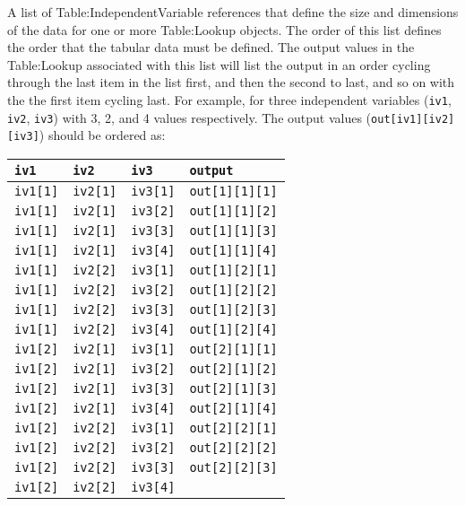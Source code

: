 A list of Table:IndependentVariable references that define the size and
dimensions of the data for one or more Table:Lookup objects. The order
of this list defines the order that the tabular data must be defined.
The output values in the Table:Lookup associated with this list will
list the output in an order cycling through the last item in the list
first, and then the second to last, and so on with the the first item
cycling last. For example, for three independent variables
(\texttt{iv1}, \texttt{iv2}, \texttt{iv3}) with 3, 2, and 4 values
respectively. The output values
(\texttt{out{[}iv1{]}{[}iv2{]}{[}iv3{]}}) should be ordered as:

\begin{longtable}[]{@{}llll@{}}
\toprule
\texttt{iv1} & \texttt{iv2} & \texttt{iv3} &
\texttt{output}\tabularnewline
\midrule
\endhead
\texttt{iv1{[}1{]}} & \texttt{iv2{[}1{]}} & \texttt{iv3{[}1{]}} &
\texttt{out{[}1{]}{[}1{]}{[}1{]}}\tabularnewline
\texttt{iv1{[}1{]}} & \texttt{iv2{[}1{]}} & \texttt{iv3{[}2{]}} &
\texttt{out{[}1{]}{[}1{]}{[}2{]}}\tabularnewline
\texttt{iv1{[}1{]}} & \texttt{iv2{[}1{]}} & \texttt{iv3{[}3{]}} &
\texttt{out{[}1{]}{[}1{]}{[}3{]}}\tabularnewline
\texttt{iv1{[}1{]}} & \texttt{iv2{[}1{]}} & \texttt{iv3{[}4{]}} &
\texttt{out{[}1{]}{[}1{]}{[}4{]}}\tabularnewline
\texttt{iv1{[}1{]}} & \texttt{iv2{[}2{]}} & \texttt{iv3{[}1{]}} &
\texttt{out{[}1{]}{[}2{]}{[}1{]}}\tabularnewline
\texttt{iv1{[}1{]}} & \texttt{iv2{[}2{]}} & \texttt{iv3{[}2{]}} &
\texttt{out{[}1{]}{[}2{]}{[}2{]}}\tabularnewline
\texttt{iv1{[}1{]}} & \texttt{iv2{[}2{]}} & \texttt{iv3{[}3{]}} &
\texttt{out{[}1{]}{[}2{]}{[}3{]}}\tabularnewline
\texttt{iv1{[}1{]}} & \texttt{iv2{[}2{]}} & \texttt{iv3{[}4{]}} &
\texttt{out{[}1{]}{[}2{]}{[}4{]}}\tabularnewline
\texttt{iv1{[}2{]}} & \texttt{iv2{[}1{]}} & \texttt{iv3{[}1{]}} &
\texttt{out{[}2{]}{[}1{]}{[}1{]}}\tabularnewline
\texttt{iv1{[}2{]}} & \texttt{iv2{[}1{]}} & \texttt{iv3{[}2{]}} &
\texttt{out{[}2{]}{[}1{]}{[}2{]}}\tabularnewline
\texttt{iv1{[}2{]}} & \texttt{iv2{[}1{]}} & \texttt{iv3{[}3{]}} &
\texttt{out{[}2{]}{[}1{]}{[}3{]}}\tabularnewline
\texttt{iv1{[}2{]}} & \texttt{iv2{[}1{]}} & \texttt{iv3{[}4{]}} &
\texttt{out{[}2{]}{[}1{]}{[}4{]}}\tabularnewline
\texttt{iv1{[}2{]}} & \texttt{iv2{[}2{]}} & \texttt{iv3{[}1{]}} &
\texttt{out{[}2{]}{[}2{]}{[}1{]}}\tabularnewline
\texttt{iv1{[}2{]}} & \texttt{iv2{[}2{]}} & \texttt{iv3{[}2{]}} &
\texttt{out{[}2{]}{[}2{]}{[}2{]}}\tabularnewline
\texttt{iv1{[}2{]}} & \texttt{iv2{[}2{]}} & \texttt{iv3{[}3{]}} &
\texttt{out{[}2{]}{[}2{]}{[}3{]}}\tabularnewline
\texttt{iv1{[}2{]}} & \texttt{iv2{[}2{]}} & \texttt{iv3{[}4{]}} &

\end{longtable}

